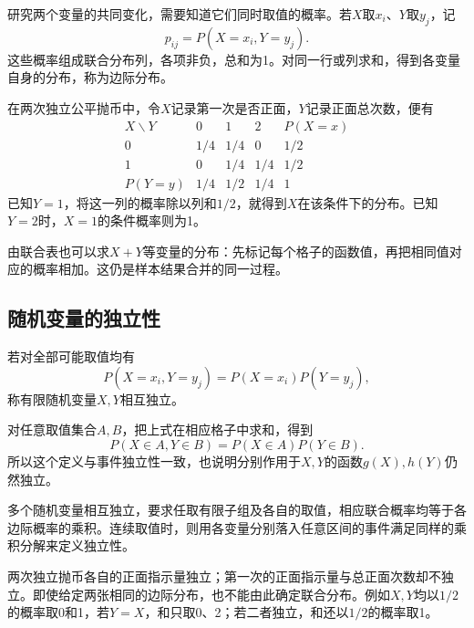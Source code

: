 研究两个变量的共同变化，需要知道它们同时取值的概率。若\(X\)取\(x_i\)、\(Y\)取\(y_j\)，记
\[
 p_{ij}=P(X=x_i,Y=y_j).
\]
这些概率组成{\heiti 联合分布列}，各项非负，总和为1。对同一行或列求和，得到各变量自身的分布，称为{\heiti 边际分布}。

在两次独立公平抛币中，令\(X\)记录第一次是否正面，\(Y\)记录正面总次数，便有
\[
\begin{array}{c|ccc|c}
 X\backslash Y&0&1&2&P(X=x)\\\hline
 0&1/4&1/4&0&1/2\\
 1&0&1/4&1/4&1/2\\\hline
 P(Y=y)&1/4&1/2&1/4&1
\end{array}
\]
已知\(Y=1\)，将这一列的概率除以列和\(1/2\)，就得到\(X\)在该条件下的分布。已知\(Y=2\)时，\(X=1\)的条件概率则为1。

由联合表也可以求\(X+Y\)等变量的分布：先标记每个格子的函数值，再把相同值对应的概率相加。这仍是样本结果合并的同一过程。

\subsection{随机变量的独立性}

\begin{definition}
若对全部可能取值均有
\begin{equation}\label{eq:prob-variable-independence}
 P(X=x_i,Y=y_j)=P(X=x_i)P(Y=y_j),
\end{equation}
称有限随机变量\(X,Y\)相互独立。
\end{definition}

对任意取值集合\(A,B\)，把上式在相应格子中求和，得到
\[
 P(X\in A,Y\in B)=P(X\in A)P(Y\in B).
\]
所以这个定义与事件独立性一致，也说明分别作用于\(X,Y\)的函数\(g(X),h(Y)\)仍然独立。

多个随机变量相互独立，要求任取有限子组及各自的取值，相应联合概率均等于各边际概率的乘积。连续取值时，则用各变量分别落入任意区间的事件满足同样的乘积分解来定义独立性。

\newpage
两次独立抛币各自的正面指示量独立；第一次的正面指示量与总正面次数却不独立。即使给定两张相同的边际分布，也不能由此确定联合分布。例如\(X,Y\)均以\(1/2\)的概率取0和1，若\(Y=X\)，和只取0、2；若二者独立，和还以\(1/2\)的概率取1。

